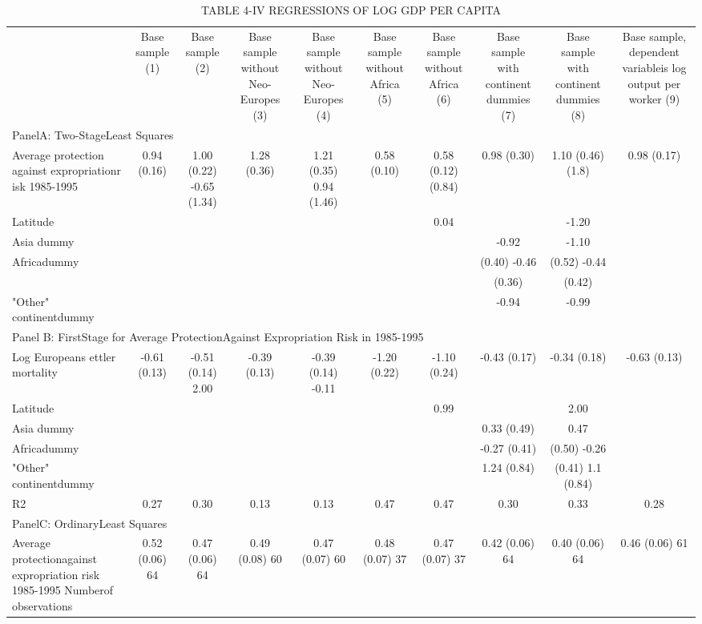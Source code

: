 \begin{table}[htbp]
\centering
\caption{TABLE  4-IV REGRESSIONS OF LOG GDP PER  CAPITA}
\begin{tabular}{lccccccccc}
\hline
 & Base sample (1) & Base sample (2) & Base sample without Neo-Europes (3) & Base sample without Neo-Europes (4) & Base sample without Africa (5) & Base sample without Africa (6) & Base sample with continent dummies (7) & Base sample with continent dummies (8) & Base sample, dependent variableis log output per worker (9) \\
\multicolumn{10}{l}{PanelA: Two-StageLeast Squares} \\
Average protection against expropriationr isk 1985-1995 & 0.94 (0.16) & 1.00 (0.22) -0.65 (1.34) & 1.28 (0.36) & 1.21 (0.35) 0.94 (1.46) & 0.58 (0.10) & 0.58 (0.12) (0.84) & 0.98 (0.30) & 1.10 (0.46) (1.8) & 0.98 (0.17) \\
Latitude &  &  &  &  &  & 0.04 &  & -1.20 &  \\
Asia dummy &  &  &  &  &  &  & -0.92 & -1.10 &  \\
Africadummy &  &  &  &  &  &  & (0.40) -0.46 & (0.52) -0.44 &  \\
 &  &  &  &  &  &  & (0.36) & (0.42) &  \\
"Other" continentdummy &  &  &  &  &  &  & -0.94 & -0.99 &  \\
\multicolumn{10}{l}{Panel B: FirstStage for Average ProtectionAgainst Expropriation Risk in 1985-1995} \\
Log Europeans ettler mortality & -0.61 (0.13) & -0.51 (0.14) 2.00 & -0.39 (0.13) & -0.39 (0.14) -0.11 & -1.20 (0.22) & -1.10 (0.24) & -0.43 (0.17) & -0.34 (0.18) & -0.63 (0.13) \\
Latitude &  &  &  &  &  & 0.99 &  & 2.00 &  \\
Asia dummy &  &  &  &  &  &  & 0.33 (0.49) & 0.47 &  \\
Africadummy &  &  &  &  &  &  & -0.27 (0.41) & (0.50) -0.26 &  \\
"Other" continentdummy &  &  &  &  &  &  & 1.24 (0.84) & (0.41) 1.1 (0.84) &  \\
R2 & 0.27 & 0.30 & 0.13 & 0.13 & 0.47 & 0.47 & 0.30 & 0.33 & 0.28 \\
\multicolumn{10}{l}{PanelC: OrdinaryLeast Squares} \\
Average protectionagainst expropriation risk 1985-1995 Numberof observations & 0.52 (0.06) 64 & 0.47 (0.06) 64 & 0.49 (0.08) 60 & 0.47 (0.07) 60 & 0.48 (0.07) 37 & 0.47 (0.07) 37 & 0.42 (0.06) 64 & 0.40 (0.06) 64 & 0.46 (0.06) 61 \\
\hline
\end{tabular}
\end{table}
